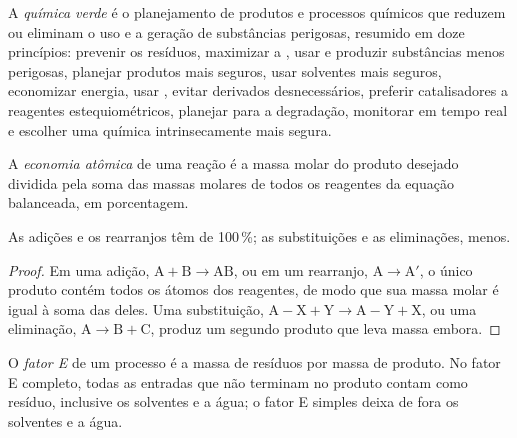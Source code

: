 \begin{definition}\label{def:b3:green-industrial:green-chemistry}
A \emph{química verde} é o planejamento de produtos e
processos químicos que reduzem ou eliminam o uso e a geração de
substâncias perigosas, resumido em doze princípios: prevenir os resíduos, maximizar
a , usar e produzir substâncias menos perigosas, planejar produtos mais seguros,
usar solventes mais seguros, economizar energia, usar , evitar derivados
desnecessários, preferir catalisadores a reagentes estequiométricos, planejar para a
degradação, monitorar em tempo real e escolher uma química intrinsecamente mais segura.
\end{definition}

\begin{definition}\label{def:b3:green-industrial:atom-economy}
A \emph{economia atômica} de uma reação é a massa molar do
produto desejado dividida pela soma das massas molares de todos os
reagentes da equação balanceada, em porcentagem.
\end{definition}

\begin{proposition}\label{prop:b3:green-industrial:ae-classes}
As adições e os rearranjos têm  de 100\,\%; as substituições e
as eliminações, menos.
\end{proposition}

\begin{proof}
Em uma adição, $\mathrm{A} + \mathrm{B} \to \mathrm{AB}$, ou em um rearranjo, $\mathrm{A} \to \mathrm{A'}$, o único produto contém todos os
átomos dos reagentes, de modo que sua massa molar é igual à soma das deles. Uma
substituição, $\mathrm{A{-}X} + \mathrm{Y} \to \mathrm{A{-}Y} + \mathrm{X}$, ou uma eliminação, $\mathrm{A} \to \mathrm{B} + \mathrm{C}$, produz um
segundo produto que leva massa embora.
\end{proof}

\begin{definition}[Fator E]\label{def:b3:green-industrial:e-factor}
O \emph{fator E} de um processo é a massa de resíduos por massa de
produto. No fator E completo, todas as entradas que não terminam no produto contam como
resíduo, inclusive os solventes e a água; o fator E simples deixa de fora os solventes e a
água.
\end{definition}


